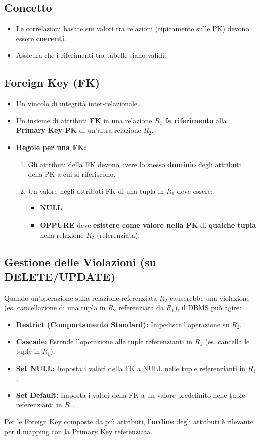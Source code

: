\documentclass{article}
\begin{document}
	\subsection{Concetto}
	\begin{itemize}
		\item Le correlazioni basate sui valori tra relazioni (tipicamente sulle PK) devono essere \textbf{coerenti}.
		\item Assicura che i riferimenti tra tabelle siano validi.
	\end{itemize}
	
	\subsection{Foreign Key (FK)}
	\begin{itemize}
		\item Un vincolo di integrità inter-relazionale.
		\item Un insieme di attributi \textbf{FK} in una relazione $R_1$ \textbf{fa riferimento} alla \textbf{Primary Key PK} di un'altra relazione $R_2$.
		\item \textbf{Regole per una FK:}
		\begin{enumerate}
			\item Gli attributi della FK devono avere lo stesso \textbf{dominio} degli attributi della PK a cui si riferiscono.
			\item Un valore negli attributi FK di una tupla in $R_1$ deve essere:
			\begin{itemize}
				\item \textbf{NULL}
				\item \textbf{OPPURE} deve \textbf{esistere come valore nella PK} di \textbf{qualche tupla} nella relazione $R_2$ (referenziata).
			\end{itemize}
		\end{enumerate}
	\end{itemize}
	
	\subsection{Gestione delle Violazioni (su DELETE/UPDATE)}
	Quando un'operazione sulla relazione referenziata $R_2$ causerebbe una violazione (es. cancellazione di una tupla in $R_2$ referenziata da $R_1$), il DBMS può agire:
	\begin{itemize}
		\item \textbf{Restrict (Comportamento Standard):} Impedisce l'operazione su $R_2$.
		\item \textbf{Cascade:} Estende l'operazione alle tuple referenzianti in $R_1$ (es. cancella le tuple in $R_1$).
		\item \textbf{Set NULL:} Imposta i valori della FK a NULL nelle tuple referenzianti in $R_1$.
		\item \textbf{Set Default:} Imposta i valori della FK a un valore predefinito nelle tuple referenzianti in $R_1$.
	\end{itemize}
	
	Per le Foreign Key composte da più attributi, l'\textbf{ordine} degli attributi è rilevante per il mapping con la Primary Key referenziata.
	
	
\end{document}
